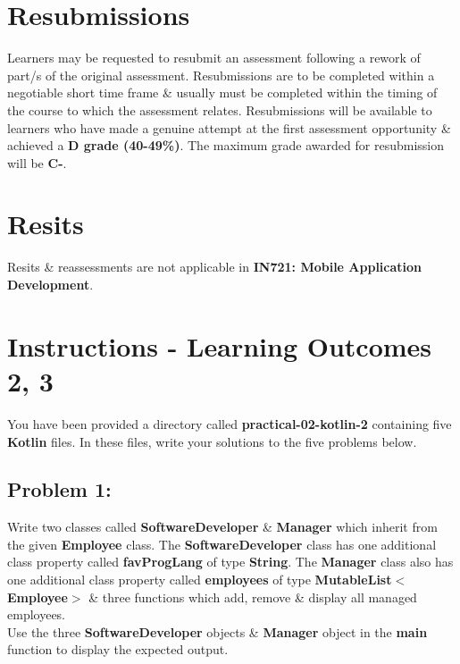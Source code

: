 \documentclass{article}
\begin{document}
\section*{Resubmissions}
Learners may be requested to resubmit an assessment following a rework of part/s of the original assessment. Resubmissions are to be completed within a negotiable short time frame \& usually must be completed within the timing of the course to which the assessment relates. Resubmissions will be available to learners who have made a genuine attempt at the first assessment opportunity \& achieved a \textbf{D grade (40-49\%)}. The maximum grade awarded for resubmission will be \textbf{C-}.

\section*{Resits}
Resits \& reassessments are not applicable in \textbf{IN721: Mobile Application Development}.

\section*{Instructions - Learning Outcomes 2, 3}
You have been provided a directory called \textbf{practical-02-kotlin-2} containing five \textbf{Kotlin} files. In these files, write your solutions to the five problems below. 

\subsection*{Problem 1:} 
Write two classes called \textbf{SoftwareDeveloper} \& \textbf{Manager} which inherit from the given \textbf{Employee} class. The \textbf{SoftwareDeveloper} class has one additional class property called \textbf{favProgLang} of type \textbf{String}. The \textbf{Manager} class also has one additional class property called \textbf{employees} of type \textbf{MutableList$<$Employee$>$} \& three functions which add, remove \& display all managed employees. \\

Use the three \textbf{SoftwareDeveloper} objects \& \textbf{Manager} object in the \textbf{main} function to display the expected output.
\end{document}
